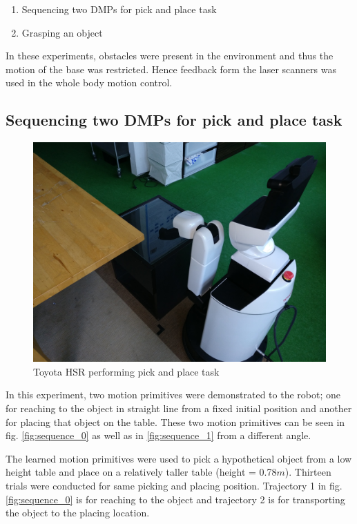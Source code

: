 \begin{enumerate}
	\item Sequencing two DMPs for pick and place task
	\item Grasping an object 
\end{enumerate} 

In these experiments, obstacles were present in the environment and thus the motion of the base was restricted. Hence feedback form the laser scanners was used in the whole body motion control.   

\subsection{Sequencing two DMPs for pick and place task}
\begin{figure}[H]
	\centering
	\includegraphics[scale=0.07]{images/multi_dmp.jpg}
	\caption{Toyota HSR performing pick and place task}
	\label{fig:multi_dmp}
\end{figure}
In this experiment, two motion primitives were demonstrated to the robot; one for reaching to the object in straight line from a fixed initial position and another for placing that object on the table. These two motion primitives can be seen in fig. \ref{fig:sequence_0} as well as in \ref{fig:sequence_1} from a different angle.

The learned motion primitives were used to pick a hypothetical object from a low height table and place on a relatively taller table (height = 0.78$m$). Thirteen trials were conducted for same picking and placing position. Trajectory 1 in fig. \ref{fig:sequence_0} is for reaching to the object and trajectory 2 is for transporting the object to the placing location. 

